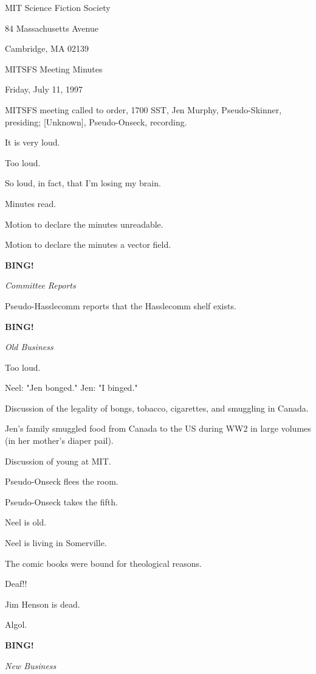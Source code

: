 \documentclass[12pt]{article}
\newcommand{\bing}{{\bf BING!} }
\newcommand{\goto}[1]{\bing \vskip 12pt \centerline{{\em{#1}}}}
\begin{document}
\begin{center}

MIT Science Fiction Society 

84 Massachusetts Avenue

Cambridge, MA 02139

\vspace{12pt}

MITSFS Meeting Minutes 

Friday, July 11, 1997

\end{center}
 
\vspace{18pt}

\setlength{\parskip}{6pt}

\noindent
MITSFS meeting called to order, 1700 SST,
Jen Murphy, Pseudo-Skinner, presiding; [Unknown], Pseudo-Onseck, recording.

It is very loud.

Too loud.

So loud, in fact, that I'm losing my brain.

Minutes read.

Motion to declare the minutes unreadable.

Motion to declare the minutes a vector field.

\goto{Committee Reports}

Pseudo-Hasslecomm reports that the Hasslecomm shelf exists.

\goto{Old Business}

Too loud.

Neel: "Jen bonged." Jen: "I binged."

Discussion of the legality of bongs, tobacco, cigarettes, and smuggling in Canada.

Jen's family smuggled food from Canada to the US during WW2 in large volumes (in her mother's diaper pail).

Discussion of young at MIT.

Pseudo-Onseck flees the room.

Pseudo-Onseck takes the fifth.

Neel is old.

Neel is living in Somerville.

The comic books were bound for theological reasons.

Deaf!!

Jim Henson is dead.

Algol.

\goto{New Business}
\end{document}
